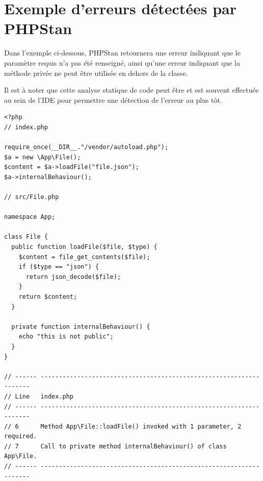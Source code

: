\clearpage
\section{Exemple d'erreurs détectées par PHPStan}

\begin{normalsize}
Dans l'exemple ci-dessous, PHPStan retournera une erreur indiquant que le paramètre requis  n'a pas été renseigné, ainsi qu'une erreur indiquant que la méthode privée  ne peut être utilisée en dehors de la classe. 

Il est à noter que cette analyse statique de code peut être et est souvent effectuée au sein de l'\gls{IDE} pour permettre une détection de l'erreur au plus tôt.
\end{normalsize}

\begin{verbatim}
<?php
// index.php

require_once(__DIR__."/vendor/autoload.php");
$a = new \App\File();
$content = $a->loadFile("file.json");
$a->internalBehaviour();

// src/File.php

namespace App;

class File {
  public function loadFile($file, $type) {
    $content = file_get_contents($file);
    if ($type == "json") {
      return json_decode($file);
    }
    return $content;
  }
  
  private function internalBehaviour() {
    echo "this is not public";
  }
}

// ------ ------------------------------------------------------------------- 
// Line   index.php                                                          
// ------ ------------------------------------------------------------------- 
// 6      Method App\File::loadFile() invoked with 1 parameter, 2 required.  
// 7      Call to private method internalBehaviour() of class App\File.      
// ------ ------------------------------------------------------------------- 

\end{verbatim}
\label{annexe:php-error}
